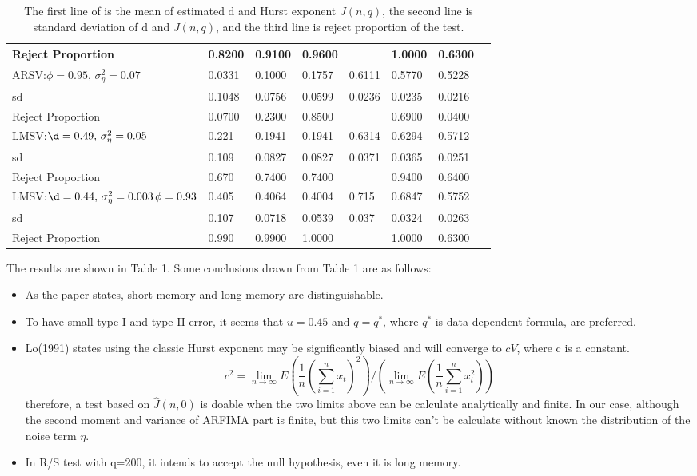 \documentclass[10pt,a4paper]{article}
\begin{document}
\begin{table}[!hbp]
\begin{tabular}{llllllll}
Reject Proportion &  0.8200 &  0.9100 &  0.9600 &\,  &  1.0000 & 0.6300\\
\hline
ARSV:$\phi=0.95,\,\sigma_\eta^2=0.07$ & 0.0331 & 0.1000 &  0.1757 & 0.6111  &  0.5770 & 0.5228 \\
sd & 0.1048 & 0.0756  & 0.0599 & 0.0236  &  0.0235 & 0.0216\\
Reject Proportion & 0.0700 & 0.2300 &  0.8500 & \, &  0.6900 & 0.0400\\
LMSV:$\d=0.49,\,\sigma_\eta^2=0.05$ &  0.221 & 0.1941  & 0.1941 & 0.6314 &    0.6294 & 0.5712 \\
sd& 0.109 & 0.0827 &  0.0827 & 0.0371  &  0.0365 & 0.0251\\
Reject Proportion &  0.670 &  0.7400 &  0.7400 & \,  &  0.9400 & 0.6400\\
\hline
LMSV:$\d=0.44,\,\sigma_\eta^2=0.003\,\phi =0.93$ &   0.405 & 0.4064 &  0.4004 & 0.715  &  0.6847 & 0.5752 \\
sd& 0.107 & 0.0718 &  0.0539 & 0.037  &  0.0324 & 0.0263\\
Reject Proportion &  0.990 & 0.9900  & 1.0000 &\,  &  1.0000 & 0.6300\\
\hline
\end{tabular}
\caption{The first line of is the mean of estimated d and Hurst exponent $J(n,q)$, the second line is standard deviation of d and $J(n,q)$, and the third line is reject proportion of the test.}
\end{table}

The results are shown in Table 1. Some conclusions drawn from Table 1 are as follows:
\begin{itemize}
\item {As the paper states, short memory and long memory are distinguishable.}
\item {To have small type I and type II error, it seems that $u=0.45$  and $q=q^*$, where $q^*$ is data dependent formula, are preferred.}
\item {Lo(1991)\cite{lo1989long} states using the classic Hurst exponent may be significantly biased and will converge to  $cV$, where c is a constant. $$c^2=\lim_{n\to\infty}E(\frac{1}{n}(\sum_{i=1}^{n}x_t)^2)/(\lim_{n\to\infty}E(\frac{1}{n}\sum_{i=1}^{n}x_t^2))$$therefore, a test based on $\hat{J}(n,0)$ is doable when the two limits above can be calculate analytically and finite. In our case, although the second moment and variance of ARFIMA part is finite, but this two limits can't be calculate without known the distribution of the noise term $\eta$.}
\item{In R/S test with q=200, it intends to accept the null hypothesis, even it is long memory.}
\end{itemize}
\end{document}
